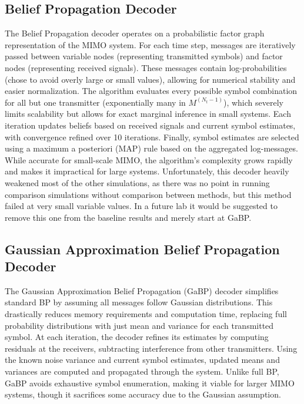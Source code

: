 \documentclass[conference]{IEEEtran}
\begin{document}
\subsection{Belief Propagation Decoder}
The Belief Propagation decoder operates on a probabilistic factor graph representation of the MIMO system. For each time step, messages are iteratively passed between variable nodes (representing transmitted symbols) and factor nodes (representing received signals). These messages contain log-probabilities (chose to avoid overly large or small values), allowing for numerical stability and easier normalization. The algorithm evaluates every possible symbol combination for all but one transmitter (exponentially many in $M^(N_t - 1)$), which severely limits scalability but allows for exact marginal inference in small systems. Each iteration updates beliefs based on received signals and current symbol estimates, with convergence refined over 10 iterations. Finally, symbol estimates are selected using a maximum a posteriori (MAP) rule based on the aggregated log-messages. While accurate for small-scale MIMO, the algorithm's complexity grows rapidly and makes it impractical for large systems. Unfortunately, this decoder heavily weakened most of the other simulations, as there was no point in running comparison simulations without comparison between methods, but this method failed at very small variable values. In a future lab it would be suggested to remove this one from the baseline results and merely start at GaBP.

\subsection{Gaussian Approximation Belief Propagation Decoder}
The Gaussian Approximation Belief Propagation (GaBP) decoder simplifies standard BP by assuming all messages follow Gaussian distributions. This drastically reduces memory requirements and computation time, replacing full probability distributions with just mean and variance for each transmitted symbol. At each iteration, the decoder refines its estimates by computing residuals at the receivers, subtracting interference from other transmitters. Using the known noise variance and current symbol estimates, updated means and variances are computed and propagated through the system. Unlike full BP, GaBP avoids exhaustive symbol enumeration, making it viable for larger MIMO systems, though it sacrifices some accuracy due to the Gaussian assumption.
\end{document}
